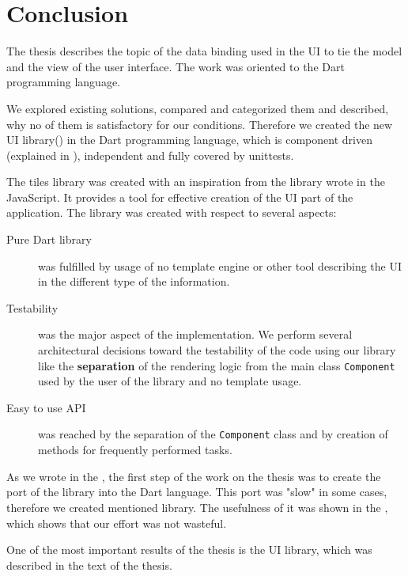 \chapter*{Conclusion}\label{chap:conclusion}

The thesis describes the topic of the data binding used in the UI to tie the model and the view of the user interface.
The work was oriented to the Dart programming language. 

We explored existing solutions, compared and categorized them and described, why no of them is satisfactory for our conditions. 
	Therefore we created the new UI library(\tiles) in the Dart programming language, 
which is component driven (explained in ), 
independent and fully covered by unittests. 

The tiles library was created with an inspiration from the \facebook \react library wrote in the JavaScript.
It provides a tool for effective creation of the UI part of the application. 
The library was created with respect to several aspects:
\begin{description}
	\item[Pure Dart library] was fulfilled by usage of no template engine 
		or other tool describing the UI in the different type of the information.
	\item[Testability] was the major aspect of the implementation. 
		We perform several architectural decisions toward the testability of the code using our library like
		the \textbf{separation} of the rendering logic from the main class \texttt{Component} used by the user of the library
		and no template usage.
	\item[Easy to use API] was reached by the separation of the \texttt{Component} class 
		and by creation of methods for frequently performed tasks.
\end{description}

As we wrote in the , the first step of the work on the thesis was 
to create the port of the \react library into the Dart language. 
This port was "slow" in some cases, therefore we created mentioned \tiles library.
The usefulness of it was shown in the , which shows that our effort was not wasteful.

One of the most important results of the thesis is the UI \tiles library, which was described in the text of the thesis.
